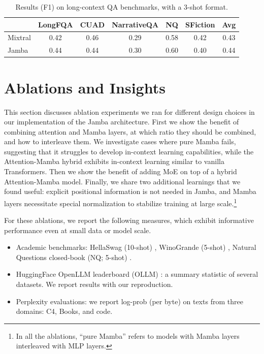 \documentclass{article}
\def\jamba{Jamba\xspace}
\begin{document}
\begin{table}[h]
    \centering
    \begin{tabular}{l ccccc | c}
    \toprule 
    & LongFQA & CUAD & NarrativeQA & NQ & SFiction &  Avg \\ 
    \midrule 
    Mixtral & 0.42 & 0.46 & 0.29 &  0.58 & 0.42 & 0.43 \\ 
    Jamba & 0.44 & 0.44 & 0.30 & 0.60 & 0.40 & 0.44 \\ 
    \bottomrule 
    \end{tabular}
    \vspace{1pt}
    \caption{Results (F1) on long-context QA benchmarks, with a 3-shot format.}
    \label{table:leval}
\end{table}


\vspace{-20pt}
\section{Ablations and Insights} \label{sec:ablations}

This section discusses ablation experiments we ran for different design choices in our implementation of the Jamba architecture. First we show the benefit of combining attention and Mamba layers, at which ratio they should be combined, and how to interleave them. 
We investigate cases where pure Mamba fails, suggesting that it struggles to develop in-context learning capabilities, while the Attention-Mamba hybrid exhibits in-context learning similar to vanilla Transformers. 
Then we show the benefit of adding MoE on top of a hybrid Attention-Mamba model. Finally, we share two additional learnings that we found useful: explicit positional information is not needed in \jamba, and Mamba layers necessitate special normalization to stabilize training at large scale.\footnote{In all the ablations, ``pure Mamba'' refers to models with Mamba layers interleaved with MLP layers.}

For these ablations, we report the following measures, which exhibit informative performance even at small data or model scale. 
\begin{itemize}[itemsep=2pt,topsep=2pt,parsep=2pt]
    \item Academic benchmarks: HellaSwag (10-shot) \cite{zellers2019hellaswag}, WinoGrande (5-shot) \cite{sakaguchi2020winogrande}, Natural Questions closed-book (NQ; 5-shot) \cite{kwiatkowski2019natural}.
    \item HuggingFace OpenLLM leaderboard (OLLM) \cite{ollm}: a summary statistic of several datasets. We report results with our reproduction.
    \item Perplexity evaluations: we report log-prob (per byte) on texts from three domains: C4, Books, and code.  
\end{itemize}
\end{document}
